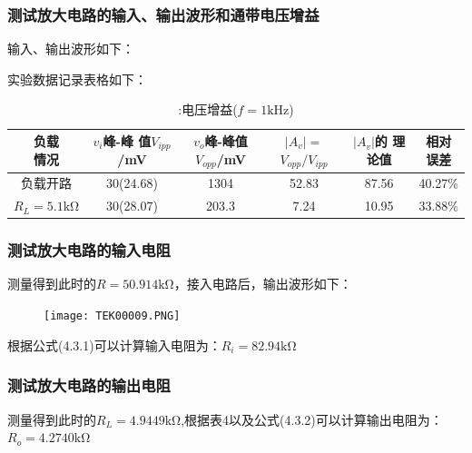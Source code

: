 \documentclass[a4paper,11pt,UTF8]{article}
\numberwithin{equation}{subsection}
\begin{document}
\subsubsection{测试放大电路的输入、输出波形和通带电压增益}
输入、输出波形如下：
\begin{figure}[H]
\end{figure}
实验数据记录表格如下：
\begin{table}[H]
	\centering
	\begin{tabular}{|c|c|c|c|c|c|}
			\hline
			\shortstack{负载\\情况} & \shortstack{$v_i$峰-峰\\值$V_{ipp}$/mV} & \shortstack{$v_o$峰-峰值\\$V_{opp}$/mV} & \shortstack{$|A_v|=$\\$V_{opp}/V_{ipp}$}	& \shortstack{$|A_v|$的\\理论值} & \shortstack{相对\\误差}\\
			\hline
			负载开路 & 30(24.68) & 1304& 52.83& 87.56 & 40.27\%\\
			\hline
			$R_L=5.1\mathrm{k\Omega}$ & 30(28.07) & 203.3 & 7.24 & 10.95 &33.88\%\\
			\hline		
		\end{tabular}
	\caption{:电压增益($f\mathrm{=}\mathrm{1kHz}$)}
\end{table}
\subsubsection{测试放大电路的输入电阻}
测量得到此时的$R=50.914\mathrm{k\Omega}$，接入电路后，输出波形如下：
\begin{figure}[H]
	\centering
	\texttt{[image: TEK00009.PNG]}
\end{figure}

根据公式(4.3.1)可以计算输入电阻为：$R_i=82.94\mathrm{k\Omega}$
\subsubsection{测试放大电路的输出电阻}
测量得到此时的$R_L=4.9449\mathrm{k\Omega}$,根据表4以及公式(4.3.2)可以计算输出电阻为：$R_o=4.2740\mathrm{k\Omega}$
\end{document}
